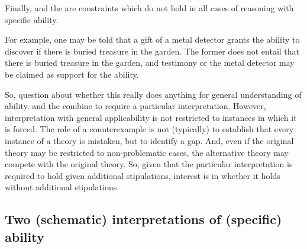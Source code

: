 \begin{note}
  Finally, \gsi{} and the \aben{} are constraints which do not hold in all cases of reasoning with specific ability.

  For example, one may be told that a gift of a metal detector grants the ability to discover if there is buried treasure in the garden.
  The former does not entail that there is buried treasure in the garden, and testimony or the metal detector may be claimed as support for the ability.

  So, question about whether this really does anything for general understanding of ability.
  \gsi{} and the \aben{} combine to require a particular interpretation.
  However, interpretation with general applicability is not restricted to instances in which it is forced.
  The role of a counterexample is not (typically) to establish that every instance of a theory is mistaken, but to identify a gap.
  And, even if the original theory may be restricted to non-problematic cases, the alternative theory may compete with the original theory.
  So, given that the particular interpretation is required to hold given additional stipulations, interest is in whether it holds without additional stipulations.
\end{note}

\subsection{Two (schematic) interpretations of (specific) ability}
\label{sec:wr-ar}

